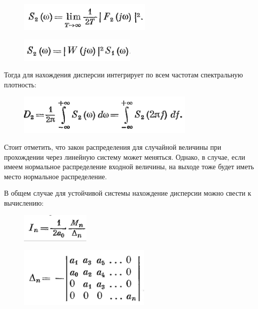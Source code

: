 \documentclass[14pt,a4paper,report]{report}
\begin{document}
\begin{figure}[h!]
	\centering
	\includegraphics[scale = 0.79]{images/5.png}
	\label{image:5}
\end{figure}

\begin{figure}[h!]
	\centering
	\includegraphics[scale = 0.79]{images/6.png}
	\label{image:6}
\end{figure}

Тогда для нахождения дисперсии интегрирует по всем частотам спектральную плотность:

\begin{figure}[h!]
	\centering
	\includegraphics[scale = 0.79]{images/7.png}
	\label{image:7}
\end{figure}

Стоит отметить, что закон распределения для случайной величины при прохождении через линейную систему может меняться. Однако, в случае, если имеем нормальное распределение входной величины, на выходе тоже будет иметь место нормальное распределение.

\clearpage

В общем случае для устойчивой системы нахождение дисперсии можно свести к вычислению:

\begin{figure}[h!]
	\centering
	\includegraphics[scale = 0.79]{images/8.png}
	\label{image:8}
\end{figure}

\begin{figure}[h!]
	\centering
	\includegraphics[scale = 0.65]{images/9.png}
	\label{image:9}
\end{figure}
\end{document}
